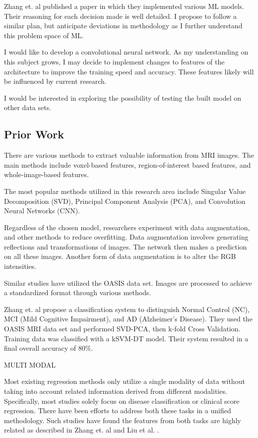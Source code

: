 \documentclass[10pt,twocolumn]{article}
\begin{document}
Zhang et. al \cite{zhang2014classification} published a paper in which they implemented various ML models. Their reasoning for each decision made is well detailed. I propose to follow a similar plan, but anticipate deviations in methodology as I further understand this problem space of ML. 

I would like to develop a convolutional neural network. As my understanding on this subject grows, I may decide to implement changes to features of the architecture to improve the training speed and accuracy. These features likely will be influenced by current research. 

I would be interested in exploring the possibility of testing the built model on other data sets. 

\subsection{Prior Work}

There are various methods to extract valuable information from MRI images. The main methods include voxel-based features, region-of-interest based features, and whole-image-based features. 

The most popular methods utilized in this research area include Singular Value Decomposition (SVD), Principal Component Analysis (PCA), and Convolution Neural Networks (CNN). 

Regardless of the chosen model, researchers experiment with data augmentation, and other methods to reduce overfitting. Data augmentation involves generating reflections and transformations of images. The network then makes a prediction on all these images. Another form of data augmentation is to alter the RGB intensities.  

Similar studies have utilized the OASIS data set. Images are processed to achieve a standardized format through various methods. 

Zhang et. al \cite{zhang2014classification} propose a classification system to distinguish Normal Control (NC), MCI (Mild Cognitive Impairment), and AD (Alzheimer's Disease). They used the OASIS MRI data set and performed SVD-PCA, then k-fold Cross Validation. Training data was classified with a kSVM-DT model. Their system resulted in a final overall accuracy of 80\%.


MULTI MODAL

Most existing regression methods only utilize a single modality of data without taking into account related information derived from different modalities. Specifically, most studies solely focus on disease classification or clinical score regression. There have been efforts to address both these tasks in a unified methodology. Such studies have found the features from both tasks are highly related as described in Zhang et. al \cite{zhang2014classification} and Liu et al. \cite{liu2018joint}. 
\end{document}
